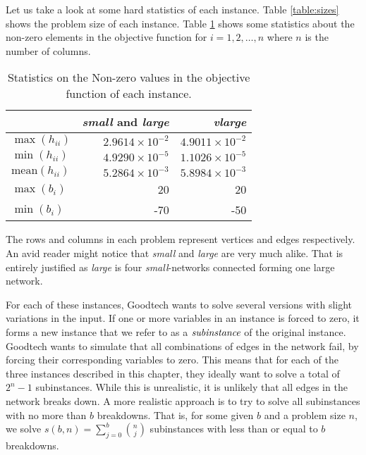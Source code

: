 Let us take a look at some hard statistics of each instance.
Table \ref{table:sizes} shows the problem size of each instance.
Table \ref{table:maxmin} shows some statistics about the non-zero elements in
the objective function for $i = 1,2,\ldots,n$ where $n$ is the number of
columns.
\begin{table}[ht!]
    \centering
    \caption{Statistics on the Non-zero values in the objective function of
each instance.}

    \begin{tabular}{lrr}
      & \textit{small} and \textit{large}         & \textit{vlarge} \\\hline
    $\max(h_{ii})$      & $2.9614 \times 10^{-2}$ & $4.9011 \times 10^{-2}$ \\
    $\min(h_{ii})$      & $4.9290 \times 10^{-5}$ & $1.1026 \times 10^{-5}$ \\
$\textrm{mean}(h_{ii})$ & $5.2864 \times 10^{-3}$ & $5.8984 \times 10^{-3}$ \\
    $\max(b_{i})$       & 20                      & 20 \\
    $\min(b_{i})$       & -70                     & -50 \\
    \end{tabular}
    \label{table:maxmin}
\end{table}
The rows and columns in each problem represent vertices and edges respectively.
An avid reader might notice that \textit{small} and \textit{large} are very
much alike.
That is entirely justified as \textit{large} is four \textit{small}-networks
connected forming one large network.

For each of these instances, Goodtech wants to solve several versions
with slight variations in the input.
If one or more variables in an instance is forced to zero, it forms a new
instance that we refer to as a $\emph{subinstance}$ of the original instance.
Goodtech wants to simulate that all combinations of edges in the network
fail, by forcing their corresponding variables to zero.
This means that for each of the three instances described in this chapter,
they ideally want to solve a total of $2^n - 1$ subinstances. While this is
unrealistic, it is unlikely that all edges in the network breaks down.
A more realistic approach is to try to solve all subinstances with no more than
$b$ breakdowns. That is, for some given $b$ and a problem size $n$, we solve
$s(b, n) = \sum_{j=0}^b {\binom{n}{j}}$ subinstances with less than or equal to
$b$ breakdowns.
